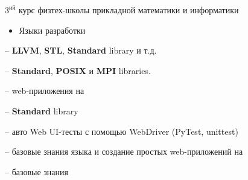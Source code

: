 \documentclass[10pt,a4paper,ragged2e,withhyper]{custom-altacv}
\begin{document}
\begin{paracol}{2}
\iffalse
\cvsection{Сертификаты и Дипломы}

\cvachievement{\faGraduationCap}{Участие в двух \textbf{международных} олимпиадах по астрономии}{IOAA и IAO}

\cvachievement{\faMedal}{Успешное завершение курса \cvtag{C++}}{Coursera -- <<Основы разработки на C++: Жёлтый пояс>>}

\cvachievement{\faMedal}{Успешное завершение курса \cvtag{Agile}}{Coursera -- <<Agile with Atlassian Jira>>}

\cvachievement{\faMedal}{Успешное завершение курса \cvtag{Java}}{JetBrains Academy -- <<Java for beginners>>}
\fi



\switchcolumn


$3^\text{ий}$ курс физтех-школы прикладной математики и информатики




\begin{itemize}
	\item \textcolor{emphasis}{Языки разработки}
\end{itemize}

 -- \textbf{LLVM}, \textbf{STL}, \textbf{Standard} library и т.д.
\vspace{1ex}

 -- \textbf{Standard}, \textbf{POSIX} и \textbf{MPI} libraries.
\vspace{1ex}

 -- web-приложения на 
\vspace{1ex}

 -- \textbf{Standard} library
\vspace{1ex}

 -- авто Web UI-тесты с помощью WebDriver (PyTest, unittest)
\vspace{1ex}

 -- базовые знания языка и создание простых web-приложений на 

 -- базовые знания
\vspace{.5ex}


\end{paracol}
\end{document}
